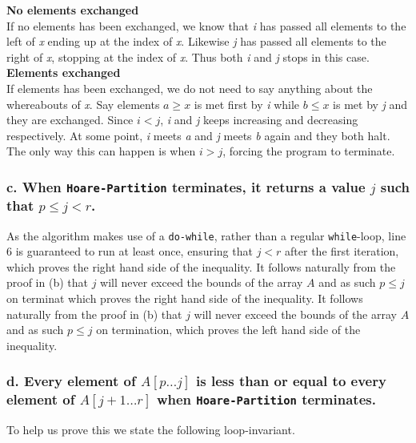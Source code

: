 \documentclass[11pt,english]{article}
\begin{document}
\textbf{No elements exchanged}\\
If no elements has been exchanged, we know that \textit{i} has passed all
elements to the left of \textit{x} ending up at the index of \textit{x}.
Likewise \textit{j} has passed all elements to the right of \textit{x},
stopping at the index of \textit{x}. Thus both \textit{i} and \textit{j}
stops in this case.\\

\textbf{Elements exchanged}\\
If elements has been exchanged, we do not need to say anything about the
whereabouts of \textit{x}. Say elements $a \geq x$ is met first by \textit{i}
while $b \leq x$ is met by \textit{j} and they are exchanged. Since
$i<j$, \textit{i} and \textit{j} keeps increasing and decreasing respectively.
At some point, \textit{i} meets \textit{a} and \textit{j} meets \textit{b}
again and they both halt. The only way this can happen is when $i>j$, forcing
the program to terminate.

\subsubsection*{\large c. \mdseries When \texttt{Hoare-Partition} terminates,
it returns a value $j$ such that $p \leq j < r$.}
As the algorithm makes use of a \texttt{do-while}, rather than a regular
\texttt{while}-loop, line 6 is guaranteed to run at least once, ensuring that
$j < r$ after the first iteration, which proves the right hand side of the
inequality. It follows naturally from the proof in (b) that $j$ will never
exceed the bounds of the array $A$ and as such $p \leq j$ on terminat which
proves the right hand side of the inequality. It follows naturally from the
proof in (b) that $j$ will never exceed the bounds of the array $A$ and as
such $p \leq j$ on termination, which proves the left hand side of the
inequality. 

\subsubsection*{\large d. \mdseries Every element of $A[p \dots j]$ is less
than or equal to every element of $A[j + 1 \dots r]$ when
\texttt{Hoare-Partition} terminates.}

To help us prove this we state the following loop-invariant. \\
\end{document}
